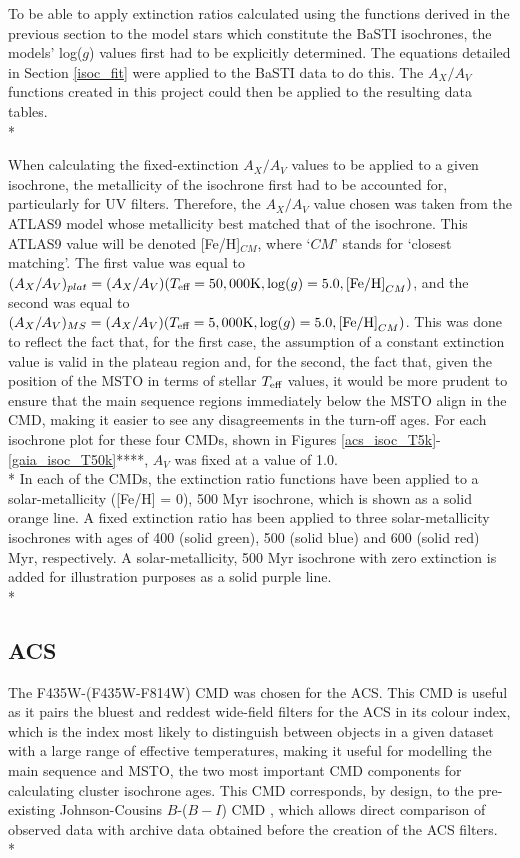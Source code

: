 \documentclass[12pt, a4paper]{report}
\begin{document}
To be able to apply extinction ratios calculated using the functions derived in the previous section to the model stars which constitute the BaSTI isochrones, the models' log($g$) values first had to be explicitly determined. The equations detailed in Section \ref{isoc_fit} were applied to the BaSTI data to do this. The $A_{X}/A_{V}$ functions created in this project could then be applied to the resulting data tables. \\*

When calculating the fixed-extinction $A_{X}/A_{V}$ values to be applied to a given isochrone, the metallicity of the isochrone first had to be accounted for, particularly for UV filters. Therefore, the $A_{X}/A_{V}$ value chosen was taken from the ATLAS9 model whose metallicity best matched that of the isochrone. This ATLAS9 value will be denoted [Fe/H]$_{CM}$, where `$CM$' stands for `closest matching'. The first value was equal to $(A_{X}/A_{V})_{plat} = (A_{X}/A_{V})(T_{\textnormal{eff}} = 50,000\textnormal{K},\log(g) = 5.0,\textnormal{[Fe/H]}_{CM})$, and the second was equal to $(A_{X}/A_{V})_{MS} = (A_{X}/A_{V})(T_{\textnormal{eff}} = 5,000\textnormal{K},\log(g) = 5.0,\textnormal{[Fe/H]}_{CM})$. This was done to reflect the fact that, for the first case, the assumption of a constant extinction value is valid in the plateau region and, for the second, the fact that, given the position of the MSTO in terms of stellar $T_{\textnormal{eff}}$ values, it would be more prudent to ensure that the main sequence regions immediately below the MSTO align in the CMD, making it easier to see any disagreements in the turn-off ages. For each isochrone plot for these four CMDs, shown in Figures \ref{acs_isoc_T5k}-\ref{gaia_isoc_T50k}****, $A_{V}$ was fixed at a value of 1.0.\\*
In each of the CMDs, the extinction ratio functions have been applied to a solar-metallicity ([Fe/H] = 0), 500 Myr isochrone, which is shown as a solid orange line. A fixed extinction ratio has been applied to three solar-metallicity isochrones with ages of 400 (solid green), 500 (solid blue) and 600 (solid red) Myr, respectively. A solar-metallicity, 500 Myr isochrone with zero extinction is added for illustration purposes as a solid purple line.\\*

\subsection{ACS} \label{ACS_isoc}
The F435W-(F435W-F814W) CMD was chosen for the ACS. This CMD is useful as it pairs the bluest and reddest wide-field filters for the ACS in its colour index, which is the index most likely to distinguish between objects in a given dataset with a large range of effective temperatures, making it useful for modelling the main sequence and MSTO, the two most important CMD components for calculating cluster isochrone ages. This CMD corresponds, by design, to the pre-existing Johnson-Cousins $B$-($B-I$) CMD \citep{2005PASP..117.1049S}, which allows direct comparison of observed data with archive data obtained before the creation of the ACS filters.\\*
\end{document}
